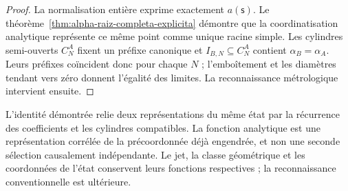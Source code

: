 \begin{proof}
La normalisation entière exprime exactement \(a(\mathsf s)\). Le
théorème~\ref{thm:alpha-raiz-completa-explicita} démontre que la coordinatisation
analytique représente ce même point comme unique racine simple. Les
cylindres semi-ouverts \(C_N^A\) fixent un préfixe canonique et
\(I_{B,N}\subseteq C_N^A\) contient \(\alpha_B=\alpha_A\). Leurs
préfixes coïncident donc pour chaque \(N\) ; l'emboîtement et les diamètres tendant vers
zéro donnent l'égalité des limites. La reconnaissance
métrologique intervient ensuite.
\end{proof}

L'identité démontrée relie deux représentations du même état
par la récurrence des coefficients et les cylindres compatibles.
La fonction analytique est une représentation corrélée de la
précoordonnée déjà engendrée, et non une seconde sélection causalement
indépendante. Le jet, la classe géométrique et les coordonnées de l'état
conservent leurs fonctions respectives ; la reconnaissance conventionnelle est ultérieure.
